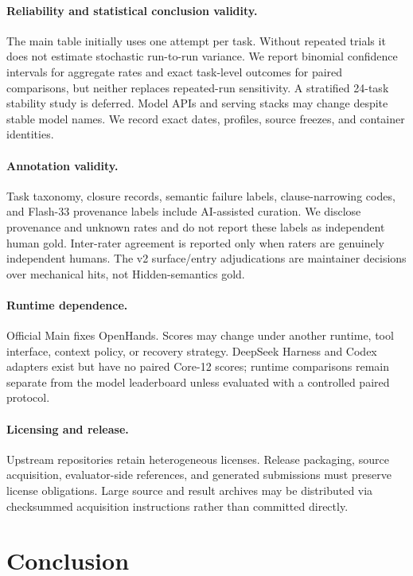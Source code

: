 \documentclass[acmsmall,anonymous,review,screen]{acmart}
\begin{document}
\paragraph{Reliability and statistical conclusion validity.}
The main table initially uses one attempt per task. Without repeated trials it
does not estimate stochastic run-to-run variance. We report binomial confidence
intervals for aggregate rates and exact task-level outcomes for paired
comparisons, but neither replaces repeated-run sensitivity. A stratified
24-task stability study is deferred. Model APIs and serving stacks may change
despite stable model names. We record exact dates, profiles, source freezes,
and container identities.

\paragraph{Annotation validity.}
Task taxonomy, closure records, semantic failure labels, clause-narrowing
codes, and Flash-33 provenance labels include AI-assisted curation. We
disclose provenance and unknown rates and do not report these labels as
independent human gold. Inter-rater agreement is reported only when raters are
genuinely independent humans. The v2 surface/entry adjudications are
maintainer decisions over mechanical hits, not Hidden-semantics gold.

\paragraph{Runtime dependence.}
Official Main fixes OpenHands. Scores may change under another runtime, tool
interface, context policy, or recovery strategy. DeepSeek Harness and Codex
adapters exist but have no paired Core-12 scores; runtime comparisons remain
separate from the model leaderboard unless evaluated with a controlled paired
protocol.

\paragraph{Licensing and release.}
Upstream repositories retain heterogeneous licenses. Release packaging, source
acquisition, evaluator-side references, and generated submissions must preserve
license obligations. Large source and result archives may be distributed via
checksummed acquisition instructions rather than committed directly.


\section{Conclusion}
\label{sec:conclusion}
\end{document}
